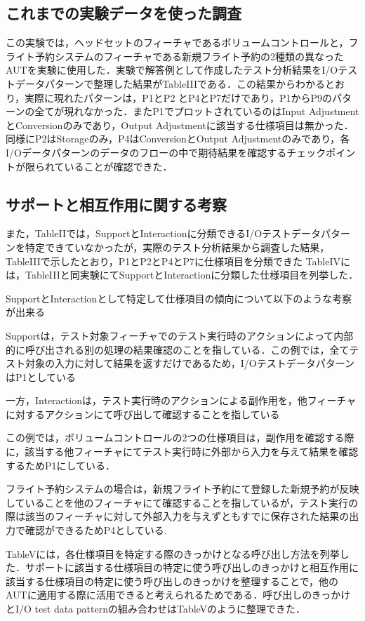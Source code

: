 \documentclass[a4paper,11pt]{jreport}
\begin{document}
\subsection{これまでの実験データを使った調査}
この実験では，ヘッドセットのフィーチャであるボリュームコントロールと，フライト予約システムのフィーチャである新規フライト予約の2種類の異なったAUTを実験に使用した．実験で解答例として作成したテスト分析結果をI/Oテストデータパターンで整理した結果がTableIIIである．この結果からわかるとおり，実際に現れたパターンは，P1とP2 とP4とP7だけであり，P1からP9のパターンの全てが現れなかった．またP1でプロットされているのはInput AdjustmentとConversionのみであり，Output Adjustmentに該当する仕様項目は無かった．同様にP2はStorageのみ，P4はConversionとOutput Adjustmentのみであり，各I/Oデータパターンのデータのフローの中で期待結果を確認するチェックポイントが限られていることが確認できた．

\subsection{サポートと相互作用に関する考察}
また，TableIIでは，SupportとInteractionに分類できるI/Oテストデータパターンを特定できていなかったが，実際のテスト分析結果から調査した結果，
TableIIIで示したとおり，P1とP2とP4とP7に仕様項目を分類できた
TableIVには，TableIIIと同実験にてSupportとInteractionに分類した仕様項目を列挙した．

SupportとInteractionとして特定して仕様項目の傾向について以下のような考察が出来る

Supportは，テスト対象フィーチャでのテスト実行時のアクションによって内部的に呼び出される別の処理の結果確認のことを指している．この例では，全てテスト対象の入力に対して結果を返すだけであるため，I/OテストデータパターンはP1としている


一方，Interactionは，テスト実行時のアクションによる副作用を，他フィーチャに対するアクションにて呼び出して確認することを指している

この例では，ボリュームコントロールの2つの仕様項目は，副作用を確認する際に，該当する他フィーチャにてテスト実行時に外部から入力を与えて結果を確認するためP1にしている．

フライト予約システムの場合は，新規フライト予約にて登録した新規予約が反映していることを他のフィーチャにて確認することを指しているが，テスト実行の際は該当のフィーチャに対して外部入力を与えずともすでに保存された結果の出力で確認ができるためP4としている.

TableVには，各仕様項目を特定する際のきっかけとなる呼び出し方法を列挙した．サポートに該当する仕様項目の特定に使う呼び出しのきっかけと相互作用に該当する仕様項目の特定に使う呼び出しのきっかけを整理することで，他のAUTに適用する際に活用できると考えられるためである．呼び出しのきっかけとI/O test data patternの組み合わせはTableVのように整理できた．
\end{document}
